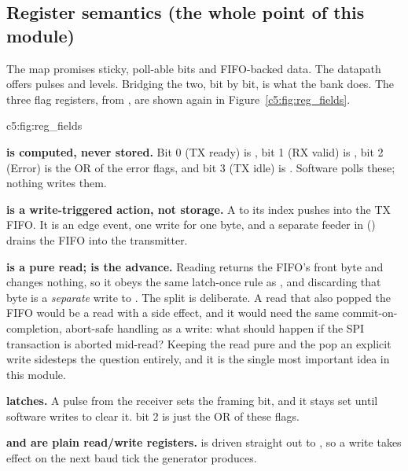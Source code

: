 \subsection{Register semantics (the whole point of this module)}
\label{c5:sec:uart_regs_semantics}
The map promises sticky, poll-able bits and FIFO-backed data. The datapath offers pulses and
levels. Bridging the two, bit by bit, is what the bank does. The three flag registers, from
, are shown again in Figure~\ref{c5:fig:reg_fields}.

  {c5:fig:reg_fields}

\textbf{ is computed, never stored.} Bit 0 (TX ready) is , bit 1 (RX
valid) is , bit 2 (Error) is the OR of the error flags, and bit 3 (TX idle) is
. Software polls these; nothing writes them.

\textbf{ is a write-triggered action, not storage.} A  to its index
pushes  into the TX FIFO. It is an edge event, one write for one byte,
and a separate feeder in  () drains the FIFO into the transmitter.

\textbf{ is a pure read;  is the advance.} Reading  returns
the FIFO's front byte and changes nothing, so it obeys the same latch-once rule as ,
and discarding that byte is a \emph{separate} write to . The split is deliberate. A read
that also popped the FIFO would be a read with a side effect, and it would need the same
commit-on-completion, abort-safe handling as a write: what should happen if the SPI transaction is
aborted mid-read? Keeping the read pure and the pop an explicit write sidesteps the question
entirely, and it is the single most important idea in this module.

\textbf{ latches.} A  pulse from the receiver sets the framing
bit, and it stays set until software writes  to clear it.  bit 2 is just the OR
of these flags.

\textbf{ and  are plain read/write registers.}  is driven
straight out to , so a  write takes effect on the next baud tick the
generator produces.

